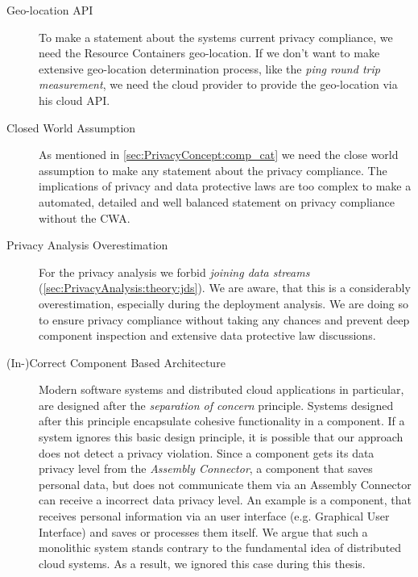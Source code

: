 \begin{description}
	\item[Geo-location API]
	To make a statement about the systems current privacy compliance, we need the Resource Containers geo-location. If we don't want to make extensive geo-location determination process, like the \textit{ping round trip measurement}, we need the cloud provider to provide the geo-location via his cloud API.
\end{description}

\begin{description}
	\item[Closed World Assumption]
	As mentioned in \autoref{sec:PrivacyConcept:comp_cat} we need the close world assumption to make any statement about the privacy compliance. The implications of privacy and data protective laws are too complex to make a automated, detailed and well balanced statement on privacy compliance without the CWA.
\end{description}

\begin{description}
	\item[Privacy Analysis Overestimation]
	For the privacy analysis we forbid \textit{joining data streams} (\autoref{sec:PrivacyAnalysis:theory:jds}). We are aware, that this is a considerably overestimation, especially during the deployment analysis. We are doing so to ensure privacy compliance without taking any chances and prevent deep component inspection and extensive data protective law discussions.
\end{description}

\begin{description}
	\item[(In-)Correct Component Based Architecture]
	Modern software systems and distributed cloud applications in particular, are designed after the \textit{separation of concern} principle. Systems designed after this principle encapsulate cohesive functionality in a component. If a system ignores this basic design principle, it is possible that our approach does not detect a privacy violation. Since a component gets its data privacy level from the \textit{Assembly Connector}, a component that saves personal data, but does not communicate them via an Assembly Connector can receive a incorrect data privacy level. An example is a component, that receives personal information via an user interface (e.g. Graphical User Interface) and saves or processes them itself. We argue that such a monolithic system stands contrary to the fundamental idea of distributed cloud systems. As a result, we ignored this case during this thesis.
\end{description}

